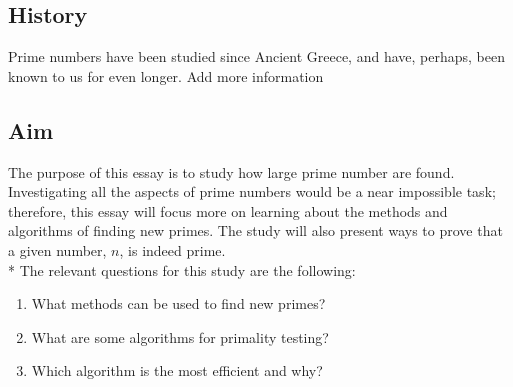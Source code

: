 \documentclass[main.tex]{subfiles}
\begin{document}
\subsection{History}
Prime numbers have been studied since Ancient Greece, and have, perhaps, been
known to us for even longer. \cite{prime} Add more information

\subsection{Aim}
The purpose of this essay is to study how large prime number are found.
Investigating all the aspects of prime numbers would be a near impossible task;
therefore, this essay will focus more on learning about the methods and
algorithms of finding new primes. The study will also present ways to prove that
a given number, $n$, is indeed prime. \newline
\\*
The relevant questions for this study are the following:
\begin{enumerate}
\item What methods can be used to find new primes?
\item What are some algorithms for primality testing?
\item Which algorithm is the most efficient and why?
\end{enumerate}
\end{document}
